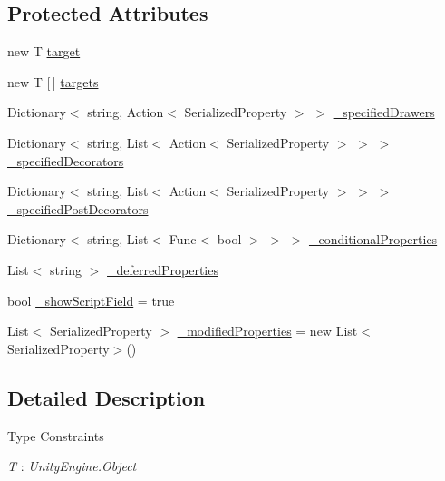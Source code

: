 \subsection*{Protected Attributes}
\begin{DoxyCompactItemize}
\item 
new T \mbox{\hyperlink{class_leap_1_1_unity_1_1_custom_editor_base_a20eea7e492831d5b4cde7eeaf0ce749e}{target}}
\item 
new T \mbox{[}$\,$\mbox{]} \mbox{\hyperlink{class_leap_1_1_unity_1_1_custom_editor_base_ab3c7d33ed1e58869160ccc7d1a189264}{targets}}
\item 
Dictionary$<$ string, Action$<$ Serialized\+Property $>$ $>$ \mbox{\hyperlink{class_leap_1_1_unity_1_1_custom_editor_base_a21f5584239f225187cba8a64f253e282}{\+\_\+specified\+Drawers}}
\item 
Dictionary$<$ string, List$<$ Action$<$ Serialized\+Property $>$ $>$ $>$ \mbox{\hyperlink{class_leap_1_1_unity_1_1_custom_editor_base_a78950630f8436e49843b8731e03d61ff}{\+\_\+specified\+Decorators}}
\item 
Dictionary$<$ string, List$<$ Action$<$ Serialized\+Property $>$ $>$ $>$ \mbox{\hyperlink{class_leap_1_1_unity_1_1_custom_editor_base_a83e87987a8f7460569ef6e19681ea884}{\+\_\+specified\+Post\+Decorators}}
\item 
Dictionary$<$ string, List$<$ Func$<$ bool $>$ $>$ $>$ \mbox{\hyperlink{class_leap_1_1_unity_1_1_custom_editor_base_ab42eb97ce1b14432882b218251fb33b7}{\+\_\+conditional\+Properties}}
\item 
List$<$ string $>$ \mbox{\hyperlink{class_leap_1_1_unity_1_1_custom_editor_base_a13a5428078b8cf9889555039b11f82c7}{\+\_\+deferred\+Properties}}
\item 
bool \mbox{\hyperlink{class_leap_1_1_unity_1_1_custom_editor_base_ac3059aa50f9038efca0963e7d25fc4fc}{\+\_\+show\+Script\+Field}} = true
\item 
List$<$ Serialized\+Property $>$ \mbox{\hyperlink{class_leap_1_1_unity_1_1_custom_editor_base_abf4b2a8736d8f769813d11b673024f26}{\+\_\+modified\+Properties}} = new List$<$Serialized\+Property$>$()
\end{DoxyCompactItemize}


\subsection{Detailed Description}
\begin{Desc}
\item[Type Constraints]\begin{description}
\item[{\em T} : {\em Unity\+Engine.\+Object}]\end{description}
\end{Desc}


